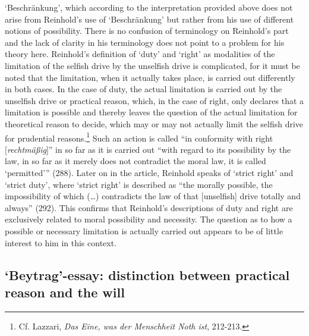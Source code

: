 `Beschr\"{a}nkung', which according to the interpretation provided above does not arise from Reinhold's use of `Beschr\"{a}nkung' but rather from his use of different notions of possibility. There is no confusion of terminology on Reinhold's part and the lack of clarity in his terminology does not point to a problem for his theory here. Reinhold's definition of `duty' and `right' as modalities of the limitation of the selfish drive by the unselfish drive is complicated, for it must be noted that the limitation, when it actually takes place, is carried out differently in both cases. In the case of duty, the actual limitation is carried out by the unselfish drive or practical reason, which, in the case of right, only declares that a limitation is possible and thereby leaves the question of the actual limitation for theoretical reason to decide, which may or may not actually limit the selfish drive for prudential reasons.\footnote{ Cf. Lazzari, \textit{Das Eine, was der Menschheit Noth ist}, 212{-}213. } Such an action is called ``in conformity with right [\textit{rechtm\"{a}\ss{}ig}]'' in so far as it is carried out ``with regard to its possibility by the law, in so far as it merely does not contradict the moral law, it is called `permitted''' (288). Later on in the article, Reinhold speaks of `strict right' and `strict duty', where `strict right' is described as ``the morally possible, the impossibility of which (\ldots ) contradicts the law of that [unselfish] drive totally and always'' (292). This confirms that Reinhold's descriptions of duty and right are exclusively related to moral possibility and necessity. The question as to how a possible or necessary limitation is actually carried out appears to be of little interest to him in this context. 


\subsection{`Beytrag'{-}essay: distinction between practical reason and the will}



